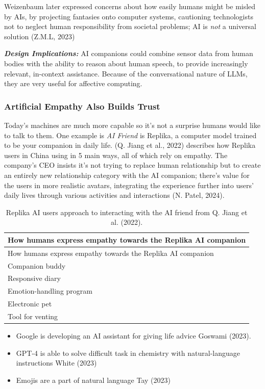 \documentclass[
  letterpaper,
  DIV=11,
  numbers=noendperiod]{scrartcl}
\providecommand{\tightlist}{%
  \setlength{\itemsep}{0pt}\setlength{\parskip}{0pt}}\usepackage{longtable,booktabs,array}
\begin{document}
Weizenbaum later expressed concerns about how easily humans might be
misled by AIs, by projecting fantasies onto computer systems, cautioning
technologists not to neglect human responsibility from societal
problems; AI is \emph{not} a universal solution (Z.M.L, 2023)

\textbf{\emph{Design Implications:}} AI companions could combine sensor
data from human bodies with the ability to reason about human speech, to
provide increasingly relevant, in-context assistance. Because of the
conversational nature of LLMs, they are very useful for affective
computing.

\subsubsection{Artificial Empathy Also Builds
Trust}\label{artificial-empathy-also-builds-trust}

Today's machines are much more capable so it's not a surprise humans
would like to talk to them. One example is \emph{AI Friend} is Replika,
a computer model trained to be your companion in daily life. (Q. Jiang
et al., 2022) describes how Replika users in China using in 5 main ways,
all of which rely on empathy. The company's CEO insists it's not trying
to replace human relationship but to create an entirely new relationship
category with the AI companion; there's value for the users in more
realistic avatars, integrating the experience further into users' daily
lives through various activities and interactions (N. Patel, 2024).

\begin{longtable}[]{@{}l@{}}
\caption{Replika AI users approach to interacting with the AI friend
from Q. Jiang et al. (2022).}\tabularnewline
\toprule\noalign{}
How humans express empathy towards the Replika AI companion \\
\midrule\noalign{}
\endfirsthead
\toprule\noalign{}
How humans express empathy towards the Replika AI companion \\
\midrule\noalign{}
\endhead
\bottomrule\noalign{}
\endlastfoot
Companion buddy \\
Responsive diary \\
Emotion-handling program \\
Electronic pet \\
Tool for venting \\
\end{longtable}

\begin{itemize}
\tightlist
\item
  Google is developing an AI assistant for giving life advice Goswami
  (2023).
\item
  GPT-4 is able to solve difficult task in chemistry with
  natural-language instructions White (2023)
\item
  Emojis are a part of natural language Tay (2023)
\end{itemize}
\end{document}
